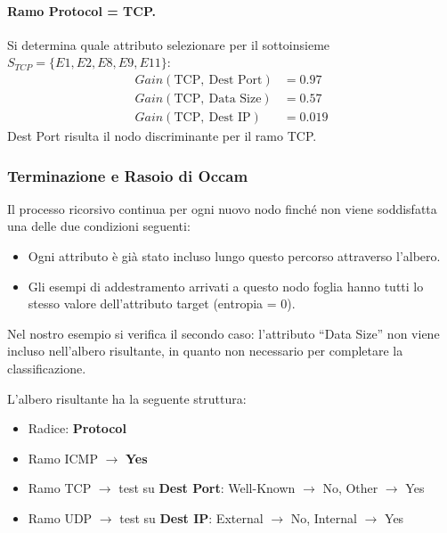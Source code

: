 \paragraph{Ramo Protocol = TCP.}
Si determina quale attributo selezionare per il
sottoinsieme $S_{TCP} = \{E1, E2, E8, E9, E11\}$:
\begin{align*}
    Gain(\text{TCP},\ \text{Dest Port}) &= 0.97 \\
    Gain(\text{TCP},\ \text{Data Size}) &= 0.57 \\
    Gain(\text{TCP},\ \text{Dest IP}) &= 0.019
\end{align*}
Dest Port risulta il nodo discriminante per il ramo TCP.

\subsubsection{Terminazione e Rasoio di Occam}

Il processo ricorsivo continua per ogni nuovo nodo finché
non viene soddisfatta una delle due condizioni seguenti:

\begin{itemize}
    \item Ogni attributo è già stato incluso lungo questo
        percorso attraverso l'albero.
    \item Gli esempi di addestramento arrivati a questo
        nodo foglia hanno tutti lo stesso valore
        dell'attributo target (entropia = 0).
\end{itemize}

Nel nostro esempio si verifica il secondo caso: l'attributo
``Data Size'' non viene incluso nell'albero risultante,
in quanto non necessario per completare la classificazione.

L'albero risultante ha la seguente struttura:
\begin{itemize}
    \item Radice: \textbf{Protocol}
    \item Ramo ICMP $\rightarrow$ \textbf{Yes}
    \item Ramo TCP $\rightarrow$ test su
        \textbf{Dest Port}:
        Well-Known $\rightarrow$ No,
        Other $\rightarrow$ Yes
    \item Ramo UDP $\rightarrow$ test su
        \textbf{Dest IP}:
        External $\rightarrow$ No,
        Internal $\rightarrow$ Yes
\end{itemize}

